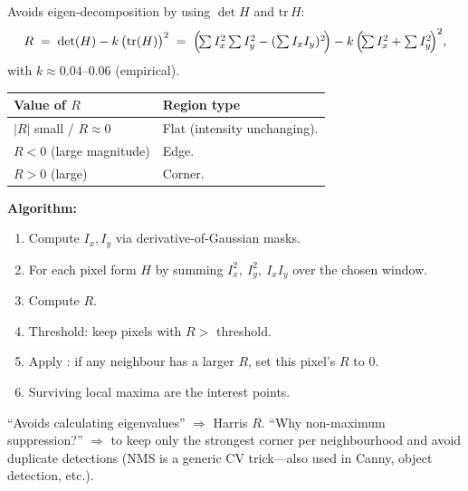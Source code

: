 \separator

\begin{thmbox}
Avoids eigen-decomposition by using $\det H$ and $\mathrm{tr}\, H$:
\[
R \;=\; \det(H) - k\,\bigl(\mathrm{tr}(H)\bigr)^2 \;=\; \Bigl(\!\textstyle\sum I_x^2 \sum I_y^2 - (\sum I_x I_y)^2\!\Bigr) - k\,\Bigl(\!\textstyle\sum I_x^2 + \sum I_y^2\!\Bigr)^2,
\]
with $k \approx 0.04$--$0.06$ (empirical).
\end{thmbox}

\begin{center}
\renewcommand{\arraystretch}{1.3}
\begin{tabular}{@{} l l @{}}
\toprule
\textbf{Value of $R$} & \textbf{Region type} \\
\midrule
$|R|$ small / $R \approx 0$ & Flat (intensity unchanging). \\
$R < 0$ (large magnitude) & Edge. \\
$R > 0$ (large) & Corner. \\
\bottomrule
\end{tabular}
\end{center}

\textbf{Algorithm:}
\begin{enumerate}
  \item Compute $I_x, I_y$ via derivative-of-Gaussian masks.
  \item For each pixel form $H$ by summing $I_x^2,\ I_y^2,\ I_x I_y$ over the chosen window.
  \item Compute $R$.
  \item Threshold: keep pixels with $R > $ threshold.
  \item Apply : if any neighbour has a larger $R$, set this pixel's $R$ to 0.
  \item Surviving local maxima are the interest points.
\end{enumerate}

\begin{tipbox}
``Avoids calculating eigenvalues'' $\Rightarrow$ Harris $R$. ``Why non-maximum suppression?'' $\Rightarrow$ to keep only the strongest corner per neighbourhood and avoid duplicate detections (NMS is a generic CV trick---also used in Canny, object detection, etc.).
\end{tipbox}

\separator

